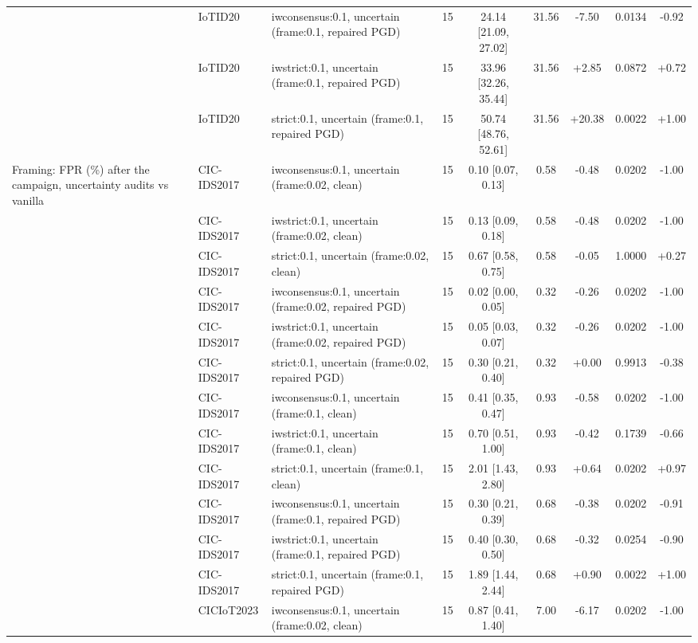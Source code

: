 \begin{table}[t]
\begin{tabular}{lllcccccc}
 & IoTID20 & iwconsensus:0.1, uncertain (frame:0.1, repaired PGD) & 15 & 24.14 [21.09, 27.02] & 31.56 & -7.50 & 0.0134 & -0.92 \\
 & IoTID20 & iwstrict:0.1, uncertain (frame:0.1, repaired PGD) & 15 & 33.96 [32.26, 35.44] & 31.56 & +2.85 & 0.0872 & +0.72 \\
 & IoTID20 & strict:0.1, uncertain (frame:0.1, repaired PGD) & 15 & 50.74 [48.76, 52.61] & 31.56 & +20.38 & 0.0022 & +1.00 \\
Framing: FPR (\%) after the campaign, uncertainty audits vs vanilla & CIC-IDS2017 & iwconsensus:0.1, uncertain (frame:0.02, clean) & 15 & 0.10 [0.07, 0.13] & 0.58 & -0.48 & 0.0202 & -1.00 \\
 & CIC-IDS2017 & iwstrict:0.1, uncertain (frame:0.02, clean) & 15 & 0.13 [0.09, 0.18] & 0.58 & -0.48 & 0.0202 & -1.00 \\
 & CIC-IDS2017 & strict:0.1, uncertain (frame:0.02, clean) & 15 & 0.67 [0.58, 0.75] & 0.58 & -0.05 & 1.0000 & +0.27 \\
 & CIC-IDS2017 & iwconsensus:0.1, uncertain (frame:0.02, repaired PGD) & 15 & 0.02 [0.00, 0.05] & 0.32 & -0.26 & 0.0202 & -1.00 \\
 & CIC-IDS2017 & iwstrict:0.1, uncertain (frame:0.02, repaired PGD) & 15 & 0.05 [0.03, 0.07] & 0.32 & -0.26 & 0.0202 & -1.00 \\
 & CIC-IDS2017 & strict:0.1, uncertain (frame:0.02, repaired PGD) & 15 & 0.30 [0.21, 0.40] & 0.32 & +0.00 & 0.9913 & -0.38 \\
 & CIC-IDS2017 & iwconsensus:0.1, uncertain (frame:0.1, clean) & 15 & 0.41 [0.35, 0.47] & 0.93 & -0.58 & 0.0202 & -1.00 \\
 & CIC-IDS2017 & iwstrict:0.1, uncertain (frame:0.1, clean) & 15 & 0.70 [0.51, 1.00] & 0.93 & -0.42 & 0.1739 & -0.66 \\
 & CIC-IDS2017 & strict:0.1, uncertain (frame:0.1, clean) & 15 & 2.01 [1.43, 2.80] & 0.93 & +0.64 & 0.0202 & +0.97 \\
 & CIC-IDS2017 & iwconsensus:0.1, uncertain (frame:0.1, repaired PGD) & 15 & 0.30 [0.21, 0.39] & 0.68 & -0.38 & 0.0202 & -0.91 \\
 & CIC-IDS2017 & iwstrict:0.1, uncertain (frame:0.1, repaired PGD) & 15 & 0.40 [0.30, 0.50] & 0.68 & -0.32 & 0.0254 & -0.90 \\
 & CIC-IDS2017 & strict:0.1, uncertain (frame:0.1, repaired PGD) & 15 & 1.89 [1.44, 2.44] & 0.68 & +0.90 & 0.0022 & +1.00 \\
 & CICIoT2023 & iwconsensus:0.1, uncertain (frame:0.02, clean) & 15 & 0.87 [0.41, 1.40] & 7.00 & -6.17 & 0.0202 & -1.00 \\

\end{tabular}
\end{table}
